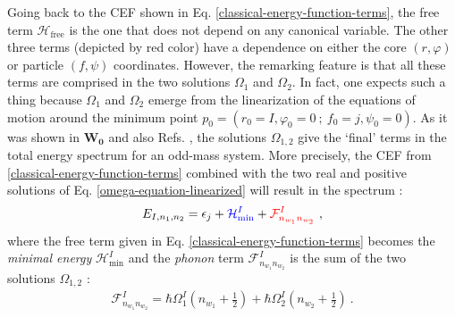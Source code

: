 Going back to the CEF shown in Eq. \ref{classical-energy-function-terms}, the free term $\mathcal{H}_\text{free}$ is the one that does not depend on any canonical variable. The other three terms (depicted by red color) have a dependence on either the core $(r,\varphi)$ or particle $(f,\psi)$ coordinates. However, the remarking feature is that all these terms are comprised in the two solutions $\Omega_1$ and $\Omega_2$. In fact, one expects such a thing because $\Omega_1$ and $\Omega_2$ emerge from the linearization of the equations of motion around the minimum point $p_0=(r_0=I,\varphi_0=0\ ;\ f_0=j,\psi_0=0)$. As it was shown in $\mathbf{W_0}$ and also Refs. \cite{raduta2020approach,raduta2020new}, the solutions $\Omega_{1,2}$ give the `final' terms in the total energy spectrum for an odd-mass system. More precisely, the CEF from \ref{classical-energy-function-terms} combined with the two real and positive solutions of Eq. \ref{omega-equation-linearized} will result in the spectrum \cite{poenaru2021extensive1}:
\begin{align}
    E_{I,n_1,n_2}=\epsilon_j+{\color{blue}\mathcal{H}_\text{min}^I}+{\color{red}\mathcal{F}^I_{n_{w_1}n_{w_2}}}\ ,
    \label{tsd-bands-compressed-spectrum}
\end{align}
where the free term given in Eq. \ref{classical-energy-function-terms} becomes the \emph{minimal energy} $\mathcal{H}_\text{min}^I$ and the \emph{phonon} term $\mathcal{F}_{n_{w_1}n_{w_2}}^I$ is the sum of the two solutions $\Omega_{1,2}$ \cite{poenaru2021extensive1}:
\begin{align}
    \mathcal{F}_{n_{w_1}n_{w_2}}^I=\hbar\Omega_1^I\left(n_{w_1}+\frac{1}{2}\right)+\hbar\Omega_2^I\left(n_{w_2}+\frac{1}{2}\right)\ .
    \label{phononic-term-tsd-energies}
\end{align}


